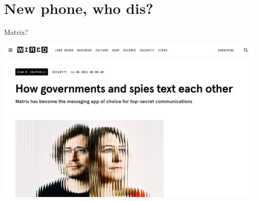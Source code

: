 \documentclass[aspectratio=169]{beamer}
\begin{document}
\begin{frame}\titlepage\end{frame}

\section{New phone, who dis?}


\begin{frame}{Matrix?}

\includegraphics[width=0.9\columnwidth]{wired.png}

\end{frame}
\end{document}
